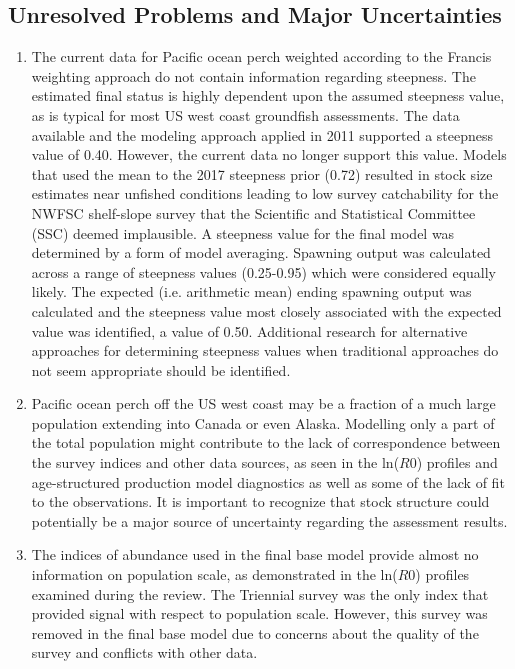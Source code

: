 \documentclass[12pt,]{article}
\begin{document}
\FloatBarrier

\subsection*{Unresolved Problems and Major
Uncertainties}\label{unresolved-problems-and-major-uncertainties}

\begin{enumerate}

\item The current data for Pacific ocean perch weighted according to the Francis weighting approach do not contain information regarding steepness.  The estimated final status is highly dependent upon the assumed steepness value, as is typical for most US west coast groundfish assessments.  The data available and the modeling approach applied in 2011 supported a steepness value of 0.40.  However, the current data no longer support this value.  Models that used the mean to the 2017 steepness prior (0.72) resulted in stock size estimates near unfished conditions leading to low survey catchability for the NWFSC shelf-slope survey that the Scientific and Statistical Committee (SSC) deemed implausible.  A steepness value for the final model was determined by a form of model averaging. Spawning output was calculated across a range of steepness values (0.25-0.95) which were considered equally likely.  The expected (i.e. arithmetic mean) ending spawning output was calculated and the steepness value most closely associated with the expected value was identified, a value of 0.50.  Additional research for alternative approaches for determining steepness values when traditional approaches do not seem appropriate should be identified.  

\item Pacific ocean perch off the US west coast may be a fraction of a much large population extending into Canada or even Alaska. Modelling only a part of the total population might contribute to the lack of correspondence between the survey indices and other data sources, as seen in the ln($R0$) profiles and age-structured production model diagnostics as well as some of the lack of fit to the observations. It is important to recognize that stock structure could potentially be a major source of uncertainty regarding the assessment results.
  
\item The indices of abundance used in the final base model provide almost no information on population scale, as demonstrated in the ln($R0$) profiles examined during the review. The Triennial survey was the only index that provided signal with respect to population scale. However, this survey was removed in the final base model due to concerns about the quality of the survey and conflicts with other data.


\end{enumerate}
\end{document}
